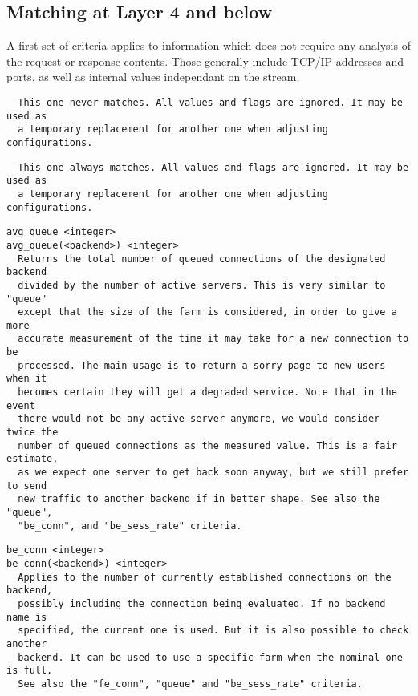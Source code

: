 
\subsection{Matching at Layer 4 and below}

A first set of criteria applies to information which does not require any
analysis of the request or response contents. Those generally include TCP/IP
addresses and ports, as well as internal values independant on the stream.

\begin{verbatim}
  This one never matches. All values and flags are ignored. It may be used as
  a temporary replacement for another one when adjusting configurations.
\end{verbatim}

\begin{verbatim}
  This one always matches. All values and flags are ignored. It may be used as
  a temporary replacement for another one when adjusting configurations.
\end{verbatim}

\begin{verbatim}
avg_queue <integer>
avg_queue(<backend>) <integer>
  Returns the total number of queued connections of the designated backend
  divided by the number of active servers. This is very similar to "queue"
  except that the size of the farm is considered, in order to give a more
  accurate measurement of the time it may take for a new connection to be
  processed. The main usage is to return a sorry page to new users when it
  becomes certain they will get a degraded service. Note that in the event
  there would not be any active server anymore, we would consider twice the
  number of queued connections as the measured value. This is a fair estimate,
  as we expect one server to get back soon anyway, but we still prefer to send
  new traffic to another backend if in better shape. See also the "queue",
  "be_conn", and "be_sess_rate" criteria.
\end{verbatim}

\begin{verbatim}
be_conn <integer>
be_conn(<backend>) <integer>
  Applies to the number of currently established connections on the backend,
  possibly including the connection being evaluated. If no backend name is
  specified, the current one is used. But it is also possible to check another
  backend. It can be used to use a specific farm when the nominal one is full.
  See also the "fe_conn", "queue" and "be_sess_rate" criteria.
\end{verbatim}

